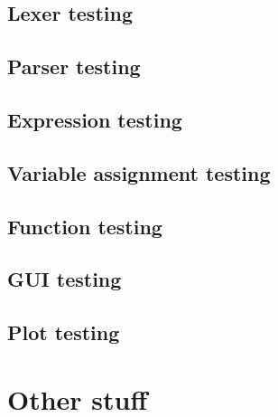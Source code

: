 \documentclass[a4paper, oneside, 11pt]{report}
\begin{document}
\section{Lexer testing}\label{sec:lexer-testing}

\section{Parser testing}\label{sec:parser-testing}

\section{Expression testing}\label{sec:arithmetic-expression-testing}

\section{Variable assignment testing}\label{sec:variable-assignment-testing}

\section{Function testing}\label{sec:function-testing}

\section{GUI testing}\label{sec:gui-testing}

\section{Plot testing}\label{sec:plot-testing}

\chapter{Other stuff}\label{ch:other-stuff}
\end{document}
